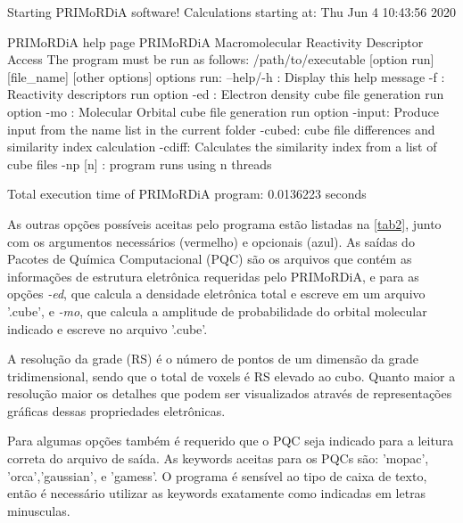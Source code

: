 \documentclass[a4paper,11pt]{refart}
\begin{document}
\hspace*{-\leftmarginwidth}
\begin{minipage}{\fullwidth}
\begin{shell}
Starting PRIMoRDiA software! 
Calculations starting at: Thu Jun  4 10:43:56 2020

PRIMoRDiA help page
PRIMoRDiA Macromolecular Reactivity Descriptor Access
The program must be run as follows:
/path/to/executable [option run] [file\_name] [other options] 
options run:
--help/-h : Display this help message
-f    : Reactivity descriptors run option
-ed   : Electron density cube file generation run option
-mo   : Molecular Orbital cube file generation run option
-input: Produce input from the name list in the current folder
-cubed: cube file differences and similarity index calculation
-cdiff: Calculates the similarity index from a list of cube files
-np [n] : program runs using n threads
	
Total execution time of PRIMoRDiA program: 0.0136223 seconds
\end{shell}
\end{minipage}

As outras opções possíveis aceitas pelo programa estão listadas na \autoref{tab2}, junto com os argumentos necessários (vermelho) e opcionais (azul). As saídas do Pacotes de Química Computacional (PQC) são os arquivos que contém as informações de estrutura eletrônica requeridas pelo PRIMoRDiA, e para as opções \emph{-ed}, que calcula a densidade eletrônica total e escreve em um arquivo '.cube', e \emph{-mo}, que calcula a amplitude de probabilidade do orbital molecular indicado e escreve no arquivo '.cube'. 

A resolução da grade (RS) é o número de pontos de um dimensão da grade tridimensional, sendo que o total de voxels é RS elevado ao cubo. Quanto maior a resolução maior os detalhes que podem ser visualizados através de representações gráficas dessas propriedades eletrônicas. 

Para algumas opções também é requerido que o PQC seja indicado para a leitura correta do arquivo de saída. As keywords aceitas para os PQCs são: 'mopac', 'orca','gaussian', e 'gamess'. O programa é sensível ao tipo de caixa de texto, então é necessário utilizar as keywords exatamente como indicadas em letras minusculas. 
\end{document}
